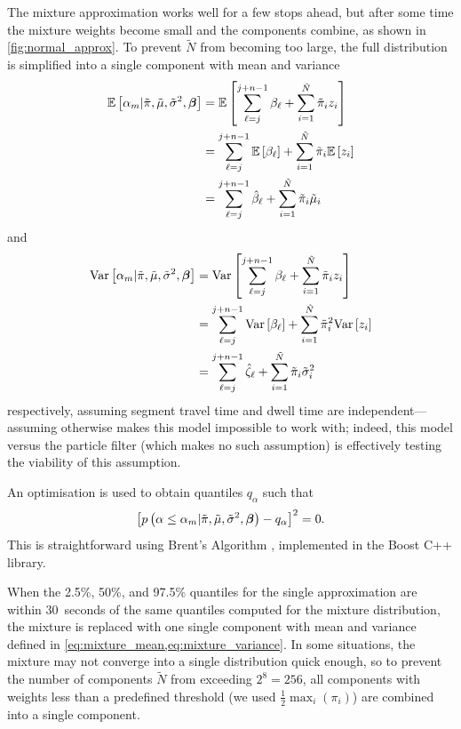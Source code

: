 The mixture approximation works well for a few stops ahead, but after some time the mixture weights become small and the components combine, as shown in \cref{fig:normal_approx}. To prevent $\tilde N$ from becoming too large, the full distribution is simplified into a single component with mean and variance
\begin{equation}
\label{eq:mixture_mean}
\begin{split}
\mathbb{E}\left[\alpha_m | \tilde\pi, \tilde\mu, \tilde\sigma^2, \boldsymbol\beta\right] &=
\mathbb{E}\left[\sum_{\ell=j}^{j+n-1} \beta_\ell +
  \sum_{i=1}^{\tilde N} \tilde\pi_i z_i\right] \\
&= \sum_{\ell=j}^{j+n-1} \mathbb{E}\left[\beta_\ell\right] +
  \sum_{i=1}^{\tilde N} \tilde\pi_i \mathbb{E}\left[z_i\right] \\
&= \sum_{\ell=j}^{j+n-1} \hat{\beta}_\ell +
  \sum_{i=1}^{\tilde N} \tilde\pi_i \tilde\mu_i
\end{split}
\end{equation}
and
\begin{equation}
\label{eq:mixture_variance}
\begin{split}
\mathrm{Var}\left[\alpha_m | \tilde\pi, \tilde\mu, \tilde\sigma^2, \boldsymbol\beta\right] &=
\mathrm{Var}\left[\sum_{\ell=j}^{j+n-1} \beta_\ell +
  \sum_{i=1}^{\tilde N} \tilde\pi_i z_i\right] \\
&= \sum_{\ell=j}^{j+n-1} \mathrm{Var}\left[\beta_\ell\right] +
  \sum_{i=1}^{\tilde N} \tilde\pi_i^2 \mathrm{Var}\left[z_i\right] \\
&= \sum_{\ell=j}^{j+n-1} \hat{\zeta}_\ell +
  \sum_{i=1}^{\tilde N} \tilde\pi_i \tilde\sigma_i^2
\end{split}
\end{equation}
respectively, assuming segment travel time and dwell time are independent---assuming otherwise makes this model impossible to work with; indeed, this model versus the particle filter (which makes no such assumption) is effectively testing the viability of this assumption.


An optimisation is used to obtain quantiles $q_\alpha$ such that
\begin{equation}
\label{eq:mixture_quadratic}
\left[
  p\left(\alpha \leq \alpha_m | \tilde\pi, \tilde\mu, \tilde\sigma^2, \boldsymbol\beta\right) - q_\alpha
\right]^2 = 0.
\end{equation}
This is straightforward using Brent's Algorithm \citep{Brent_1971}, implemented in the Boost \textsf{C++} library.

When the 2.5\%, 50\%, and 97.5\% quantiles for the single approximation are within 30~seconds of the same quantiles computed for the mixture distribution, the mixture is replaced with one single component with mean and variance defined in \cref{eq:mixture_mean,eq:mixture_variance}. In some situations, the mixture may not converge into a single distribution quick enough, so to prevent the number of components $\tilde N$ from exceeding $2^8=256$, all components with weights less than a predefined threshold (we used $\frac{1}{2}\max_i(\pi_i)$) are combined into a single component.

